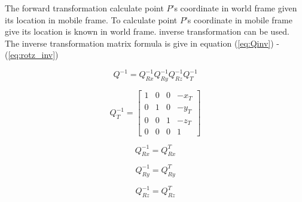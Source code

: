The forward transformation calculate point $P$'s coordinate in world
frame given its location in mobile frame. To calculate point $P$'s
coordinate in mobile frame give its location is known in world frame.
inverse transformation can be used. The inverse transformation matrix
formula is give in equation (\ref{eq:Qinv}) - (\ref{eq:rotz_inv})

\begin{equation}
\label{eq:Qinv}
Q^{-1}=Q_{Rx}^{-1} Q_{Ry}^{-1} Q_{Rz}^{-1} Q_T^{-1}
\end{equation}

\begin{equation}
\label{eq:translate_inv}
Q_{T}^{-1}=\begin{bmatrix}
1 & 0 & 0 & -x_T \\
0 & 1 & 0 & -y_T \\
0 & 0 & 1 & -z_T \\
0 & 0 & 0 & 1\end{bmatrix}
\end{equation}

\begin{equation}
\label{eq:rotx_inv}
Q_{Rx}^{-1}=Q_{Rx}^{T}
\end{equation}

\begin{equation}
\label{eq:roty_inv}
Q_{Ry}^{-1}=Q_{Ry}^{T}
\end{equation}

\begin{equation}
\label{eq:rotz_inv}
Q_{Rz}^{-1}=Q_{Rz}^{T}
\end{equation}




